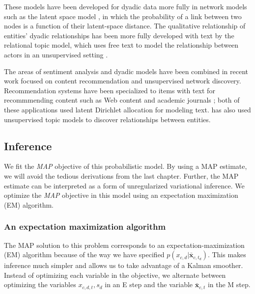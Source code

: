These models have been developed for dyadic data more fully in network
models such as the latent space model \citep{hoff:2002,sarkar:2005}, in
which the probability of a link between two nodes is a function of
their latent-space distance.  The qualitative relationship of
entities' dyadic relationships has been more fully developed with text
by the relational topic model, which uses free text to model the
relationship between actors in an unsupervised setting
\citep{chang:2009}.

The areas of sentiment analysis and dyadic models have been combined
in recent work focused on content recommendation and unsupervised
network discovery.  Recommendation systems have been specialized to
items with text for recommmending content such as Web content
\citep{agarwal:2010} and academic journals \citep{wang:2011}; both of
these applications used latent Dirichlet allocation for modeling text.
\cite{chang:2009} has also used unsupervised topic models to discover
relationships between entities.



\subsection{Inference}
\label{sec:fr_inference}
We fit the \emph{MAP} objective of this probabilistic model.  By using
a MAP estimate, we will avoid the tedious derivations from the last
chapter.  Further, the MAP estimate can be interpreted as a form of
unregularized variational inference.  We optimize the \emph{MAP}
objective in this model using an expectation maximization (EM)
algorithm.

\subsubsection{An expectation maximization algorithm}
The MAP solution to this problem corresponds to an
expectation-maximization (EM) algorithm because of the way we have
specified $p(x_{c,d} | \bm \bar x_{c, t_d})$.  This makes inference
much simpler and allows us to take advantage of a Kalman smoother.
Instead of optimizing each variable in the objective, we alternate
between optimizing the variables $x_{c,d,t}, s_d$ in an E step and the
variable $\bm \bar x_{c,t}$ in the M step.

